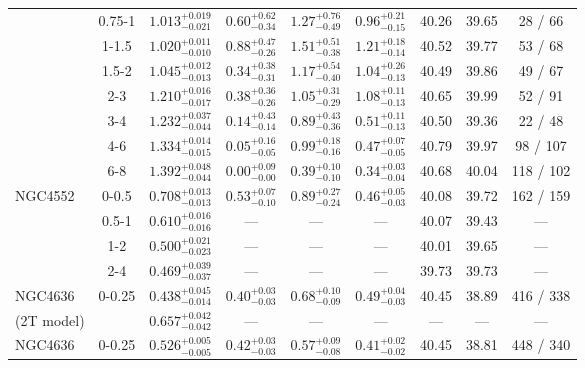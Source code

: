 \documentclass[structabstract]{aa}
\begin{document}
{{\begin{longtable}{lcccccccc}
 & 0.75-1 & $ 1.013 _{- 0.021 }^{+ 0.019 } $ & $  0.60 _{-  0.34 }^{+  0.62 } $ & $  1.27 _{-  0.49 }^{+  0.76 } $ & $  0.96 _{-  0.15 }^{+  0.21 } $ &  40.26 & 39.65 &    28 /    66 \\
 & 1-1.5 & $ 1.020 _{- 0.010 }^{+ 0.011 } $ & $  0.88 _{-  0.26 }^{+ 0.47 } $ & $  1.51 _{-  0.38 }^{+  0.51 } $ & $  1.21 _{-  0.14 }^{+ 0.18 } $ &  40.52 & 39.77 &    53 /    68 \\
 & 1.5-2 & $ 1.045 _{- 0.013 }^{+ 0.012 } $ & $  0.34 _{-  0.31 }^{+  0.38 } $ & $  1.17 _{-  0.40 }^{+  0.54 } $ & $  1.04 _{-  0.13 }^{+  0.26 } $ &  40.49 & 39.86 &    49 /    67 \\
 & 2-3 & $ 1.210 _{- 0.017 }^{+ 0.016 } $ & $  0.38 _{-  0.26 }^{+  0.36 } $ & $  1.05 _{-  0.29 }^{+  0.31 } $ & $  1.08 _{-  0.13 }^{+  0.11 } $ &  40.65 & 39.99 &    52 /    91 \\
 & 3-4 & $ 1.232 _{- 0.044 }^{+ 0.037 } $ & $  0.14 _{-  0.14 }^{+  0.43 } $ & $  0.89 _{-  0.36 }^{+  0.43 } $ & $  0.51 _{-  0.13 }^{+  0.11 } $ &  40.50 & 39.36 &    22 /    48 \\
 & 4-6 & $ 1.334 _{- 0.015 }^{+ 0.014 } $ & $  0.05 _{-  0.05 }^{+  0.16 } $ & $  0.99 _{-  0.16 }^{+  0.18 } $ & $  0.47 _{-  0.05 }^{+  0.07 } $ &  40.79 & 39.97 &    98 /   107 \\
 & 6-8 & $ 1.392 _{- 0.044 }^{+ 0.048 } $ & $  0.00 _{-  0.00 }^{+  0.09 } $ & $  0.39 _{-  0.10 }^{+  0.10 } $ & $  0.34 _{-  0.04 }^{+  0.03 } $ &  40.68 & 40.04 &   118 /   102 \\
\hline
NGC4552 & 0-0.5 & $ 0.708 _{- 0.013 }^{+ 0.013 } $ & $  0.53 _{-  0.10 }^{+  0.07 } $ & $  0.89 _{-  0.24 }^{+  0.27 } $ & $  0.46 _{-  0.03 }^{+  0.05 } $ &  40.08 &39.72 &   162 /   159 \\
 & 0.5-1 & $ 0.610 _{- 0.016 }^{+ 0.016 } $ & --- & --- & --- &  40.07 & 39.43 & --- \\
 & 1-2 & $ 0.500 _{- 0.023 }^{+ 0.021 } $ & --- & --- & --- &  40.01 & 39.65 & --- \\
 & 2-4 & $ 0.469 _{- 0.037 }^{+ 0.039 } $ & --- & --- & --- &  39.73 & 39.73 & --- \\
\hline
NGC4636 & 0-0.25 & $ 0.438 _{- 0.014 }^{+ 0.045 } $ & $  0.40 _{-  0.03 }^{+  0.03 } $ & $  0.68 _{-  0.09 }^{+  0.10 } $ & $  0.49 _{-  0.03 }^{+  0.04 } $ &  40.45 & 38.89 &   416 /   338 \\
(2T model) & & $ 0.657 _{- 0.042 }^{+ 0.042 } $ & --- & --- & --- & --- & --- & --- \\
\hline
NGC4636 & 0-0.25 & $ 0.526 _{- 0.005 }^{+ 0.005 } $ & $  0.42 _{-  0.03 }^{+  0.03 } $ & $  0.57 _{-  0.08 }^{+  0.09 } $ & $  0.41 _{-  0.02 }^{+  0.02 } $ &  40.45 & 38.81 &   448 /   340 \\

\end{longtable}}}
\end{document}
